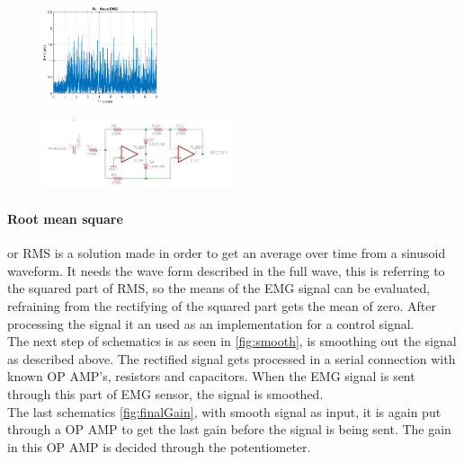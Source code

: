 \begin{multicols}{2}
\begin{figure}[H]
    \centering
   \includegraphics[width=0.3\textwidth]{Figures/EMG/epsFig}
    \caption{}
\end{figure} 
\columnbreak
\begin{figure}[H]
    \centering
    \includegraphics[width=0.5\textwidth]{Figures/EMG/Rect.PNG}
    \caption{\cite{SparkfunScematicEMG}}
    \label{fig:rect}
\end{figure} 
\end{multicols} 
\paragraph{Root mean square} or RMS is a solution made in order to get an average over time from a sinusoid waveform. It needs the wave form described in the full wave, this is referring to the squared part of RMS, so the means of the EMG signal can be evaluated, refraining from the rectifying of the squared part gets the mean of zero\cite{RMS}. After processing the signal it
an used as an implementation for a control signal.\\
The next step of schematics is as seen in \ref{fig:smooth}, is smoothing out the signal as described above. The rectified signal gets processed in a serial connection with known OP AMP's, resistors and capacitors. When the EMG signal is sent through this part of EMG sensor, the signal is smoothed.\\
The last schematics \ref{fig:finalGain}, with smooth signal as input, it is again put through a OP AMP to get the last gain before the signal is being sent. The gain in this OP AMP is decided through the potentiometer.\\


